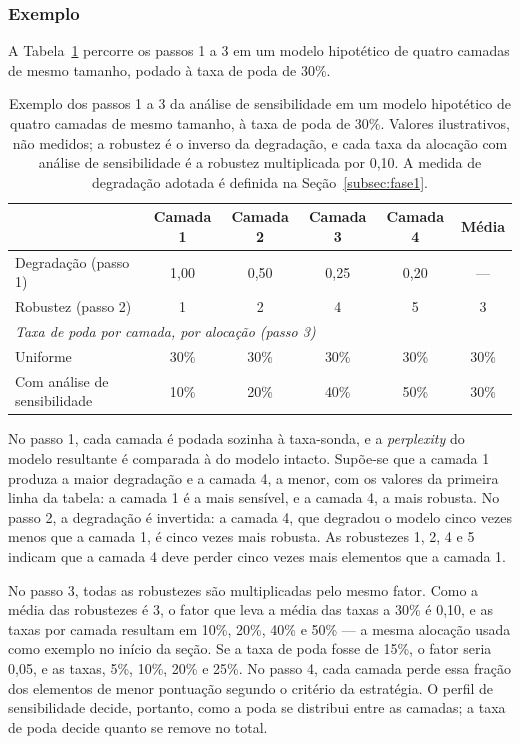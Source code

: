 \subsubsection*{Exemplo}

A Tabela~\ref{tab:exemplo_alocacao} percorre os passos 1 a 3 em um modelo hipotético de
quatro camadas de mesmo tamanho, podado à taxa de poda de 30\%.

\begin{table}[htb]
\centering
\caption{Exemplo dos passos 1 a 3 da análise de sensibilidade em um modelo hipotético de
quatro camadas de mesmo tamanho, à taxa de poda de 30\%. Valores ilustrativos, não
medidos; a robustez é o inverso da degradação, e cada taxa da alocação com análise de
sensibilidade é a robustez multiplicada por 0,10. A medida de degradação adotada é definida
na Seção~\ref{subsec:fase1}.}
\label{tab:exemplo_alocacao}
\small
\setlength{\tabcolsep}{5pt}
\begin{tabular}{l ccccc}
\hline
 & \textbf{Camada 1} & \textbf{Camada 2} & \textbf{Camada 3} & \textbf{Camada 4} & \textbf{Média} \\
\hline
Degradação (passo 1) & 1,00 & 0,50 & 0,25 & 0,20 & --- \\
Robustez (passo 2) & 1 & 2 & 4 & 5 & 3 \\
\hline
\multicolumn{6}{l}{\textit{Taxa de poda por camada, por alocação (passo 3)}} \\
Uniforme & 30\% & 30\% & 30\% & 30\% & 30\% \\
Com análise de sensibilidade & 10\% & 20\% & 40\% & 50\% & 30\% \\
\hline
\end{tabular}
\end{table}

No passo 1, cada camada é podada sozinha à taxa-sonda, e a \textit{perplexity} do modelo
resultante é comparada à do modelo intacto. Supõe-se que a camada 1 produza a maior
degradação e a camada 4, a menor, com os valores da primeira linha da tabela: a camada 1 é
a mais sensível, e a camada 4, a mais robusta. No passo 2, a degradação é invertida: a
camada 4, que degradou o modelo cinco vezes menos que a camada 1, é cinco vezes mais
robusta. As robustezes 1, 2, 4 e 5 indicam que a camada 4 deve perder cinco vezes mais
elementos que a camada 1.

No passo 3, todas as robustezes são multiplicadas pelo mesmo fator. Como a média das
robustezes é 3, o fator que leva a média das taxas a 30\% é 0,10, e as taxas por camada
resultam em 10\%, 20\%, 40\% e 50\% --- a mesma alocação usada como exemplo no início da
seção. Se a taxa de poda fosse de 15\%, o fator seria 0,05, e
as taxas, 5\%, 10\%, 20\% e 25\%. No passo 4, cada camada perde essa fração dos elementos de
menor pontuação segundo o critério da estratégia. O perfil de sensibilidade decide, portanto,
como a poda se distribui entre as camadas; a taxa de poda decide quanto se remove no total.

